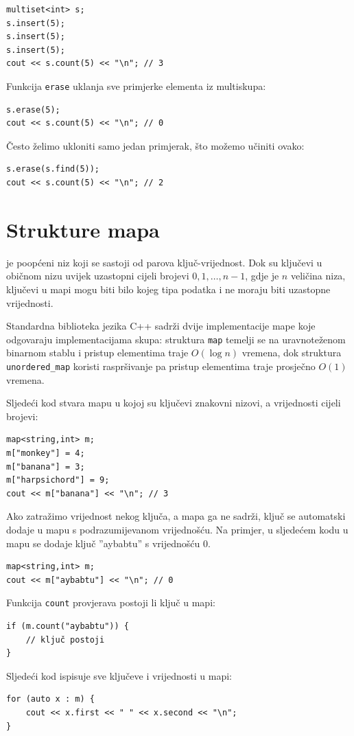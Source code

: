 \begin{lstlisting}
multiset<int> s;
s.insert(5);
s.insert(5);
s.insert(5);
cout << s.count(5) << "\n"; // 3
\end{lstlisting}
Funkcija \texttt{erase} uklanja
sve primjerke elementa
iz multiskupa:
\begin{lstlisting}
s.erase(5);
cout << s.count(5) << "\n"; // 0
\end{lstlisting}
Često želimo ukloniti samo jedan primjerak,
što možemo učiniti ovako:
\begin{lstlisting}
s.erase(s.find(5));
cout << s.count(5) << "\n"; // 2
\end{lstlisting}

\section{Strukture mapa}


 je poopćeni niz
koji se sastoji od parova ključ-vrijednost.
Dok su ključevi u običnom nizu uvijek
uzastopni cijeli brojevi $0,1,\ldots,n-1$,
gdje je $n$ veličina niza,
ključevi u mapi mogu biti bilo kojeg tipa podatka i
ne moraju biti uzastopne vrijednosti.

Standardna biblioteka jezika C++ sadrži dvije
implementacije mape koje odgovaraju
implementacijama skupa: struktura
\texttt{map} temelji se na uravnoteženom
binarnom stablu i pristup elementima
traje $O(\log n)$ vremena,
dok struktura
\texttt{unordered\_map} koristi raspršivanje
pa pristup elementima traje prosječno $O(1)$ vremena.

Sljedeći kod stvara mapu
u kojoj su ključevi znakovni nizovi, a vrijednosti cijeli brojevi:

\begin{lstlisting}
map<string,int> m;
m["monkey"] = 4;
m["banana"] = 3;
m["harpsichord"] = 9;
cout << m["banana"] << "\n"; // 3
\end{lstlisting}

Ako zatražimo vrijednost nekog ključa,
a mapa ga ne sadrži,
ključ se automatski dodaje u mapu s
podrazumijevanom vrijednošću.
Na primjer, u sljedećem kodu
u mapu se dodaje ključ ''aybabtu''
s vrijednošću 0.

\begin{lstlisting}
map<string,int> m;
cout << m["aybabtu"] << "\n"; // 0
\end{lstlisting}
Funkcija \texttt{count} provjerava
postoji li ključ u mapi:
\begin{lstlisting}
if (m.count("aybabtu")) {
    // ključ postoji
}
\end{lstlisting}
Sljedeći kod ispisuje sve ključeve i vrijednosti
u mapi:
\begin{lstlisting}
for (auto x : m) {
    cout << x.first << " " << x.second << "\n";
}
\end{lstlisting}

